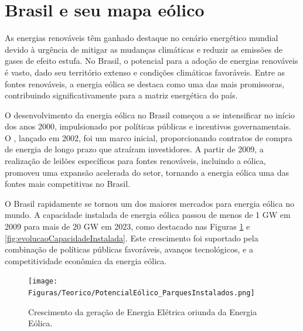 \section{Brasil e seu mapa eólico}
\par As energias renováveis têm ganhado destaque no cenário energético mundial devido à urgência de mitigar as mudanças climáticas e reduzir as emissões de gases de efeito estufa. No Brasil, o potencial para a adoção de energias renováveis é vasto, dado seu território extenso e condições climáticas favoráveis. Entre as fontes renováveis, a energia eólica se destaca como uma das mais promissoras, contribuindo significativamente para a matriz energética do país.
\par O desenvolvimento da energia eólica no Brasil começou a se intensificar no início dos anos 2000, impulsionado por políticas públicas e incentivos governamentais. O , lançado em 2002, foi um marco inicial, proporcionando contratos de compra de energia de longo prazo que atraíram investidores. A partir de 2009, a realização de leilões específicos para fontes renováveis, incluindo a eólica, promoveu uma expansão acelerada do setor, tornando a energia eólica uma das fontes mais competitivas no Brasil.
\par O Brasil rapidamente se tornou um dos maiores mercados para energia eólica no mundo. A capacidade instalada de energia eólica passou de menos de 1 GW em 2009 para mais de 20 GW em 2023, como destacado nas Figuras \ref{fig:Turbinas_instaladas} e \ref{fig:evolucaoCapacidadeInstalada}. Este crescimento foi suportado pela combinação de políticas públicas favoráveis, avanços tecnológicos, e a competitividade econômica da energia eólica.

\begin{figure}[H]
    \caption{Crescimento da geração de Energia Elétrica oriunda da Energia Eólica.}
    \label{fig:Turbinas_instaladas}
    \centering
    \texttt{[image: Figuras/Teorico/PotencialEólico\_ParquesInstalados.png]}
\end{figure}

